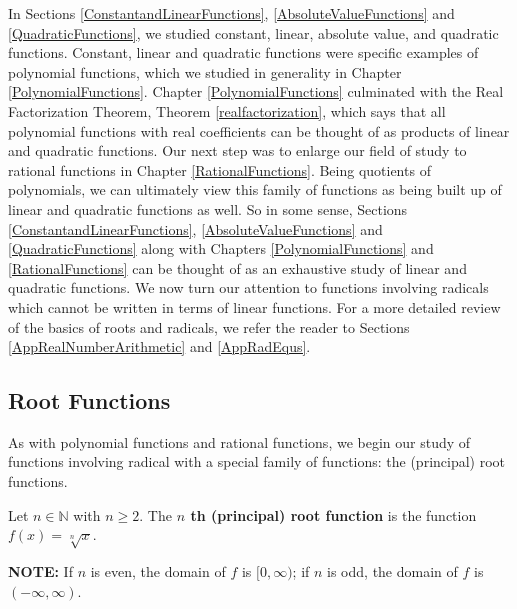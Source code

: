 

\setcounter{footnote}{0}

\label{RootRadicalFunctions}

In Sections \ref{ConstantandLinearFunctions}, \ref{AbsoluteValueFunctions} and \ref{QuadraticFunctions}, we studied constant, linear,  absolute value, and quadratic functions.  Constant, linear and quadratic functions were specific examples of polynomial functions, which we studied in generality in Chapter \ref{PolynomialFunctions}. Chapter \ref{PolynomialFunctions} culminated with the Real Factorization Theorem, Theorem \ref{realfactorization}, which says that all polynomial functions with real coefficients can be thought of as products of linear and quadratic functions.  Our next step was to enlarge our field of study to rational functions in Chapter \ref{RationalFunctions}.  Being quotients of polynomials, we can ultimately view this family of functions as being built up of linear and quadratic functions as well.  So in some sense, Sections   \ref{ConstantandLinearFunctions}, \ref{AbsoluteValueFunctions} and \ref{QuadraticFunctions} along with Chapters \ref{PolynomialFunctions} and \ref{RationalFunctions} can be thought of as an exhaustive study of linear and quadratic functions.  We now turn our attention to functions involving radicals which cannot be written in terms of linear functions.  For a more detailed review of the basics of roots and radicals, we refer the reader to Sections \ref{AppRealNumberArithmetic} and  \ref{AppRadEqus}.  

\subsection{Root Functions}
\label{RootFunctions}

As with polynomial functions and rational functions, we begin our study of functions involving radical with a special family of functions: the (principal) root functions.

\begin{mdefn}
\label{principalrootfunction}  Let $n \in \mathbb{N}$ with $n \geq 2$.  The  \textbf{$n$ th (principal) root function} is the function $f(x) = \sqrt[n]{x}$.  

\textbf{NOTE:}  If $n$ is even, the domain of $f$ is $[0, \infty)$;  if $n$ is odd, the domain of $f$ is $(-\infty, \infty)$.

\end{mdefn}

